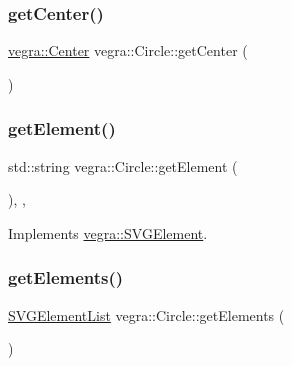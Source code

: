 \mbox{\label{structvegra_1_1Circle_a8dd74def2123ae009053c067f653380d}} 
\subsubsection{\texorpdfstring{get\+Center()}{getCenter()}}
{\footnotesize\ttfamily \mbox{\hyperlink{structvegra_1_1Center}{vegra\+::\+Center}} vegra\+::\+Circle\+::get\+Center (\begin{DoxyParamCaption}{ }\end{DoxyParamCaption})\hspace{0.3cm}{\ttfamily [inline]}}

\mbox{\label{structvegra_1_1Circle_a50bdbe7e4b29530b131e7a1157190b00}} 
\subsubsection{\texorpdfstring{get\+Element()}{getElement()}}
{\footnotesize\ttfamily std\+::string vegra\+::\+Circle\+::get\+Element (\begin{DoxyParamCaption}{ }\end{DoxyParamCaption})\hspace{0.3cm}{\ttfamily [inline]}, {\ttfamily [override]}, {\ttfamily [virtual]}}



Implements \mbox{\hyperlink{structvegra_1_1SVGElement_a17fa30b9de97e1541eaa1f6888145de2}{vegra\+::\+S\+V\+G\+Element}}.

\mbox{\label{structvegra_1_1Circle_a657b1849c50925b9f38e1f13ac0f4cd5}} 
\subsubsection{\texorpdfstring{get\+Elements()}{getElements()}}
{\footnotesize\ttfamily \mbox{\hyperlink{namespacevegra_a2722f5eceb74f65746a02a57b71d125e}{S\+V\+G\+Element\+List}} vegra\+::\+Circle\+::get\+Elements (\begin{DoxyParamCaption}{ }\end{DoxyParamCaption})\hspace{0.3cm}{\ttfamily [inline]}}



